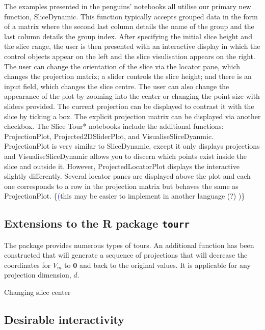 \documentclass[]{interact}
\theoremstyle{plain}%
\theoremstyle{definition}
\theoremstyle{remark}
\begin{document}
The examples presented in the penguins' notebooks all utilise our
primary new function, SliceDynamic. This function typically accepts
grouped data in the form of a matrix where the second last column
details the name of the group and the last column details the group
index. After specifying the initial slice height and the slice range,
the user is then presented with an interactive display in which the
control objects appear on the left and the slice visulisation appears on
the right. The user can change the orientation of the slice via the
locator pane, which changes the projection matrix; a slider controls the
slice height; and there is an input field, which changes the slice
centre. The user can also change the appearance of the plot by zooming
into the center or changing the point size with sliders provided. The
current projection can be displayed to contrast it with the slice by
ticking a box. The explicit projection matrix can be displayed via
another checkbox. The Slice Tour* notebooks include the additional
functions: ProjectionPlot, Projected2DSliderPlot, and
VisualiseSliceDyanmic. ProjectionPlot is very similar to SliceDynamic,
except it only displays projections and VisualiseSliceDynamic allows you
to discern which points exist inside the slice and outside it. However,
ProjectedLocatorPlot displays the interactive slightly differently.
Several locator panes are displayed above the plot and each one
corresponds to a row in the projection matrix but behaves the same as
ProjectionPlot. \{\textcolor{blue}(this may be easier to implement in
another language (?) )\}

\hypertarget{extensions-to-the-r-package-tourr}{%
\subsection{\texorpdfstring{Extensions to the R package
\texttt{tourr}}{Extensions to the R package tourr}}\label{extensions-to-the-r-package-tourr}}

The \citet{tourr} package provides numerous types of tours. An
additional function has been constructed that will generate a sequence
of projections that will decrease the coordinates for \(V_m\) to
\(\boldsymbol{0}\) and back to the original values. It is applicable for
any projection dimension, \(d\).

Changing slice center

\hypertarget{desirable-interactivity}{%
\subsection{Desirable interactivity}\label{desirable-interactivity}}
\end{document}
